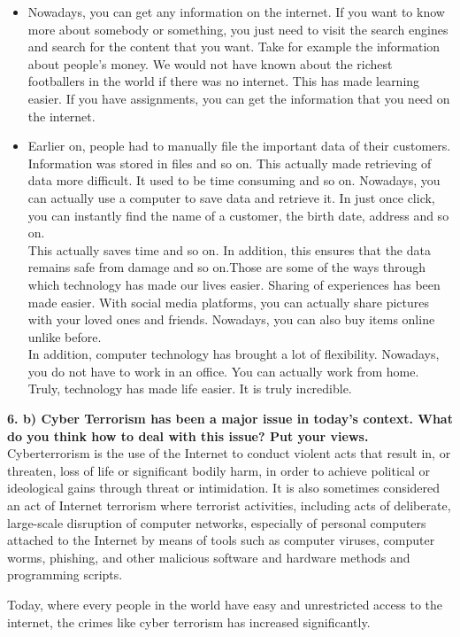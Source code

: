 \documentclass [12pt, a4paper]{article}
\begin{document}
\begin{itemize}
\item Nowadays, you can get any information on the internet. If you want to know more about somebody or something, you just need to visit the search engines and search for the content that you want. Take for example the information about people's money. We would not have known about the richest footballers in the world if there was no internet. This has made learning easier. If you have assignments, you can get the information that you need on the internet.

\item Earlier on, people had to manually file the important data of their customers. Information was stored in files and so on. This actually made retrieving of data more difficult. It used to be time consuming and so on. Nowadays, you can actually use a computer to save data and retrieve it. In just once click, you can instantly find the name of a customer, the birth date, address and so on.\\
This actually saves time and so on. In addition, this ensures that the data remains safe from damage and so on.Those are some of the ways through which technology has made our lives easier. Sharing of experiences has been made easier. With social media platforms, you can actually share pictures with your loved ones and friends. Nowadays, you can also buy items online unlike before.\\
In addition, computer technology has brought a lot of flexibility. Nowadays, you do not have to work in an office. You can actually work from home. Truly, technology has made life easier. It is truly incredible.

\end{itemize}

\large
\textbf{ 6. b) Cyber Terrorism has been a major issue in today's context. What do you think how to deal with this issue? Put your views.}\\
\normalsize
Cyberterrorism is the use of the Internet to conduct violent acts that result in, or threaten, loss of life or significant bodily harm, in order to achieve political or ideological gains through threat or intimidation. It is also sometimes considered an act of Internet terrorism where terrorist activities, including acts of deliberate, large-scale disruption of computer networks, especially of personal computers attached to the Internet by means of tools such as computer viruses, computer worms, phishing, and other malicious software and hardware methods and programming scripts.\\
\par
Today, where every people in the world have easy and unrestricted access to the internet, the crimes like cyber terrorism has increased significantly.
\end{document}
